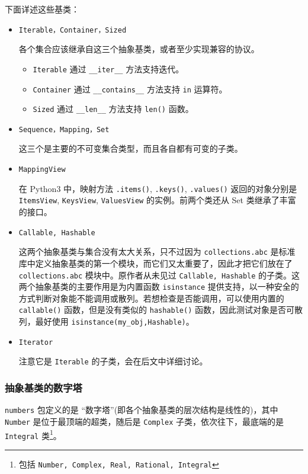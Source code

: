 下面详述这些基类：
\begin{itemize}
    \item \texttt{Iterable，Container，Sized} 
    
    各个集合应该继承自这三个抽象基类，或者至少实现兼容的协议。
    \begin{itemize}
        \item \texttt{Iterable} 通过 \texttt{\_\_iter\_\_} 方法支持迭代。
        \item \texttt{Container} 通过 \texttt{\_\_contains\_\_} 方法支持 \texttt{in} 运算符。
        \item \texttt{Sized} 通过 \texttt{\_\_len\_\_} 方法支持 \texttt{len()} 函数。
    \end{itemize}

    \item \texttt{Sequence，Mapping，Set} 
    
    这三个是主要的不可变集合类型，而且各自都有可变的子类。

    \item \texttt{MappingView} 
    
    在 Python3 中，映射方法 \texttt{.items()}, \texttt{.keys()}, \texttt{.values()} 返回的对象分别是 \texttt{ItemsView}, \texttt{KeysView}, \texttt{ValuesView} 的实例。前两个类还从 \textrm{Set} 类继承了丰富的接口。

    \item \texttt{Callable, Hashable} 
    
    这两个抽象基类与集合没有太大关系，只不过因为 \texttt{collections.abc} 是标准库中定义抽象基类的第一个模块，而它们又太重要了，因此才把它们放在了 \texttt{collections.abc} 模块中。原作者从未见过 \texttt{Callable, Hashable} 的子类。这两个抽象基类的主要作用是为内置函数 \texttt{isinstance} 提供支持，以一种安全的方式判断对象能不能调用或散列。若想检查是否能调用，可以使用内置的 \texttt{callable()} 函数，但是没有类似的 \texttt{hashable()} 函数，因此测试对象是否可散列，最好使用 \texttt{isinstance(my\_obj,Hashable)}。

    \item \texttt{Iterator} 
    
    注意它是 \texttt{Iterable} 的子类，会在后文中详细讨论。
\end{itemize}

\subsubsection{抽象基类的数字塔}

\texttt{numbers} 包定义的是 ``数字塔''(即各个抽象基类的层次结构是线性的)，其中 \texttt{Number} 是位于最顶端的超类，随后是 \texttt{Complex} 子类，依次往下，最底端的是 \texttt{Integral} 类\footnote{包括 \texttt{Number, Complex, Real, Rational, Integral}}。

